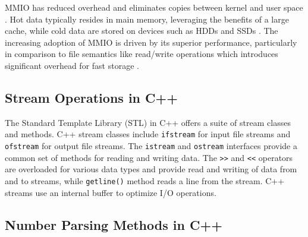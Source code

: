 MMIO has reduced overhead and eliminates copies between kernel and user space \cite{malliotakis2021hugemap, papagiannis2020optimizing}. Hot data typically resides in main memory, leveraging the benefits of a large cache, while cold data are stored on devices such as HDDs and SSDs \cite{song2016efficient}. The increasing adoption of MMIO is driven by its superior performance, particularly in comparison to file semantics like read/write operations which introduces significant overhead for fast storage \cite{yoshimura2019evfs, enberg2022transcending}. 





\subsection{Stream Operations in C++}

The Standard Template Library (STL) in C++ offers a suite of stream classes and methods. C++ stream classes include \texttt{ifstream} for input file streams and \texttt{ofstream} for output file streams. The \texttt{istream} and \texttt{ostream} interfaces provide a common set of methods for reading and writing data. The \texttt{>>} and \texttt{<<} operators are overloaded for various data types and provide read and writing of data from and to streams, while \texttt{getline()} method reads a line from the stream. C++ streams use an internal buffer to optimize I/O operations.




\subsection{Number Parsing Methods in C++}

